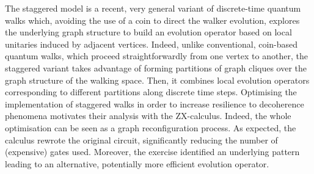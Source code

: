 %
%
%


The staggered model is a recent, very general variant of discrete-time quantum walks which, avoiding the use of a coin to direct the walker evolution, explores the underlying graph structure to build an evolution operator based on local unitaries induced by adjacent vertices. Indeed, unlike conventional, coin-based quantum walks, which proceed straightforwardly from one vertex to another, the staggered variant takes advantage of forming partitions of graph cliques over the graph structure of the walking space. Then, it combines  local evolution operators  corresponding to different partitions  along discrete time steps.  Optimising  the implementation of staggered walks in order to increase resilience to decoherence phenomena motivates their analysis with the ZX-calculus. Indeed,  the whole optimisation  can be seen as a graph reconfiguration process. As expected, the calculus rewrote the original circuit, significantly reducing the number of (expensive) gates used. Moreover, the exercise identified an underlying pattern leading to an alternative, potentially more efficient evolution operator.



%
%
%
%
%
%
%
%
